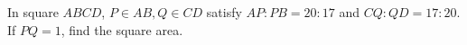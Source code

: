 In square $ ABCD $, $ P\in AB,Q\in CD $ satisfy $ AP:PB=20:17 $ and $ CQ:QD=17:20 $. If $ PQ=1 $, find the square area.

